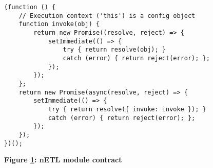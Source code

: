 \begin{figure}[H]
  \centering
  \begin{mdframed}
    \centering
    \begin{verbatim}
(function () {
    // Execution context ('this') is a config object
    function invoke(obj) {
        return new Promise((resolve, reject) => {
            setImmediate(() => {
                try { return resolve(obj); }
                catch (error) { return reject(error); };
            });
        });
    };
    return new Promise(async(resolve, reject) => {
        setImmediate(() => {
            try { return resolve({ invoke: invoke }); }
            catch (error) { return reject(error); };
        });
    });
})();
        \end{verbatim}
  \end{mdframed}
  \caption[nETL module contract]{\textbf{Figure \ref{fig-module-contract}: nETL module contract}}
  \label{fig-module-contract}
\end{figure}